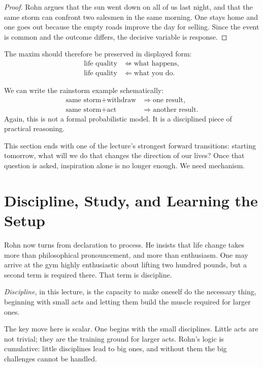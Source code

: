 \begin{proof}
Rohn argues that the sun went down on all of us last night, and that the same storm can confront two salesmen in the same morning. One stays home and one goes out because the empty roads improve the day for selling. Since the event is common and the outcome differs, the decisive variable is response.
\end{proof}

The maxim should therefore be preserved in displayed form:
\begin{align}
\text{life quality} &\not\Leftarrow \text{what happens},\\
\text{life quality} &\Leftarrow \text{what you do}.
\end{align}

We can write the rainstorm example schematically:
\begin{align}
\text{same storm} + \text{withdraw} &\Rightarrow \text{one result},\\
\text{same storm} + \text{act} &\Rightarrow \text{another result}.
\end{align}
Again, this is not a formal probabilistic model. It is a disciplined piece of practical reasoning.

This section ends with one of the lecture's strongest forward transitions: starting tomorrow, what will we do that changes the direction of our lives? Once that question is asked, inspiration alone is no longer enough. We need mechanism.

\section{Discipline, Study, and Learning the Setup}

Rohn now turns from declaration to process. He insists that life change takes more than philosophical pronouncement, and more than enthusiasm. One may arrive at the gym highly enthusiastic about lifting two hundred pounds, but a second term is required there. That term is discipline.

\begin{definition}
\emph{Discipline}, in this lecture, is the capacity to make oneself do the necessary thing, beginning with small acts and letting them build the muscle required for larger ones.
\end{definition}

The key move here is scalar. One begins with the small disciplines. Little acts are not trivial; they are the training ground for larger acts. Rohn's logic is cumulative: little disciplines lead to big ones, and without them the big challenges cannot be handled.


